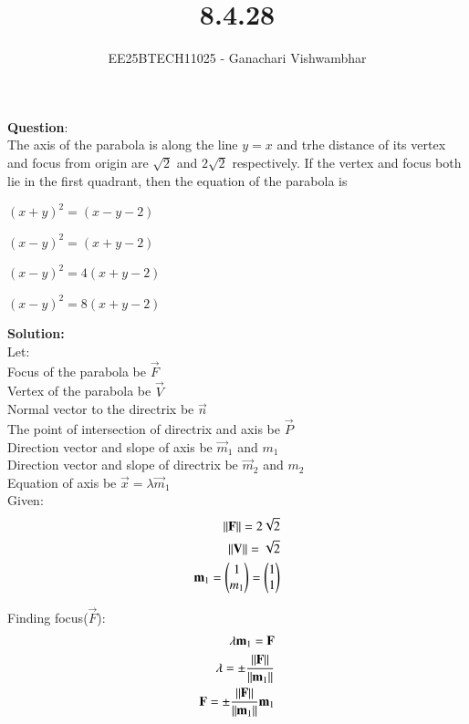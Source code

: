 \documentclass[journal]{IEEEtran}
\begin{document}
\title{8.4.28}
\author{EE25BTECH11025 - Ganachari Vishwambhar}
\maketitle

\textbf{Question}:\\
The axis of the parabola is along the line $y=x$ and trhe distance of its vertex and focus from origin are $\sqrt{2}$ and $2\sqrt{2}$ respectively. If the vertex and focus both lie in the first quadrant, then the equation of the parabola is
\begin{enumerate}
\begin{multicols}{2}
    \item $(x+y)^2=(x-y-2)$
    \item $(x-y)^2=(x+y-2)$
    \item $(x-y)^2=4(x+y-2)$
    \item $(x-y)^2=8(x+y-2)$
\end{multicols}
\end{enumerate}
\textbf{Solution: }\\
Let:\\
Focus of the parabola be $\vec{F}$\\
Vertex of the parabola be $\vec{V}$\\
Normal vector to the directrix be $\vec{n}$\\
The point of intersection of directrix and axis be $\vec{P}$\\
Direction vector and slope of axis be $\vec{m}_1$ and $m_1$\\
Direction vector and slope of directrix be $\vec{m}_2$ and $m_2$\\
Equation of axis be $\vec{x}=\lambda\vec{m}_1$\\
Given:
\begin{align}
    \left\lVert\mathbf{F}\right\rVert = 2\sqrt{2}\\
    \left\lVert\mathbf{V}\right\rVert = \sqrt{2}\\
    \mathbf{m}_1 = \begin{pmatrix}1\\m_1\end{pmatrix}=\begin{pmatrix}1\\1\end{pmatrix}
\end{align}

Finding focus($\vec{F}$):
\begin{align}
    \lambda\mathbf{m}_1=\mathbf{F}\\
    \lambda = \pm\frac{\left\lVert\mathbf{F}\right\rVert}{\left\lVert\mathbf{m}_1\right\rVert}\\
    \mathbf{F} = \pm\frac{\left\lVert\mathbf{F}\right\rVert}{\left\lVert\mathbf{m}_1\right\rVert}\mathbf{m}_1
\end{align}
\end{document}

